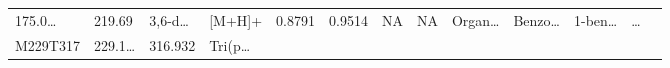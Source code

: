 \documentclass[
]{article}
\begin{document}
\begin{longtable}[]{@{}lllllllllllll@{}}
\begin{minipage}[t]{0.05\columnwidth}
175.0\ldots{}\strut
\end{minipage} & \begin{minipage}[t]{0.05\columnwidth}\raggedright
219.69\strut
\end{minipage} & \begin{minipage}[t]{0.05\columnwidth}\raggedright
3,6-d\ldots{}\strut
\end{minipage} & \begin{minipage}[t]{0.05\columnwidth}\raggedright
{[}M+H{]}+\strut
\end{minipage} & \begin{minipage}[t]{0.07\columnwidth}\raggedright
0.8791\strut
\end{minipage} & \begin{minipage}[t]{0.07\columnwidth}\raggedright
0.9514\strut
\end{minipage} & \begin{minipage}[t]{0.05\columnwidth}\raggedright
NA\strut
\end{minipage} & \begin{minipage}[t]{0.04\columnwidth}\raggedright
NA\strut
\end{minipage} & \begin{minipage}[t]{0.05\columnwidth}\raggedright
Organ\ldots{}\strut
\end{minipage} & \begin{minipage}[t]{0.05\columnwidth}\raggedright
Benzo\ldots{}\strut
\end{minipage} & \begin{minipage}[t]{0.05\columnwidth}\raggedright
1-ben\ldots{}\strut
\end{minipage} & \begin{minipage}[t]{0.02\columnwidth}\raggedright
\ldots{}\strut
\end{minipage}\tabularnewline
\begin{minipage}[t]{0.05\columnwidth}\raggedright
M229T317\strut
\end{minipage} & \begin{minipage}[t]{0.05\columnwidth}\raggedright
229.1\ldots{}\strut
\end{minipage} & \begin{minipage}[t]{0.05\columnwidth}\raggedright
316.932\strut
\end{minipage} & \begin{minipage}[t]{0.05\columnwidth}\raggedright
Tri(p\ldots{}\strut
\end{minipage} & \begin{minipage}[t]{0.05\columnwidth}\raggedright

\end{minipage}
\end{longtable}
\end{document}
